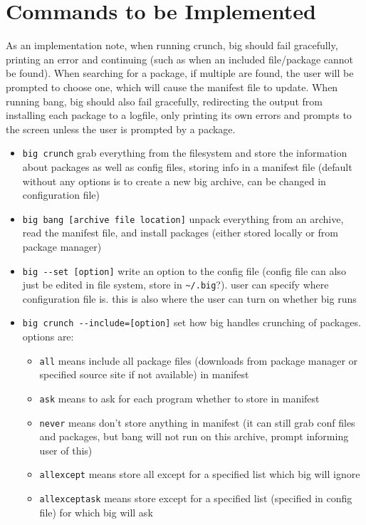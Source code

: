 \documentclass[12pt]{article}
\begin{document}
    \section{Commands to be Implemented}
        As an implementation note, when running crunch, big should fail gracefully, printing an error and continuing (such as when an included file/package cannot be found).  When searching for a package, if multiple are found, the user will be prompted to choose one, which will cause the manifest file to update.  When running bang, big should also fail gracefully, redirecting the output from installing each package to a logfile, only printing its own errors and prompts to the screen unless the user is prompted by a package.
        \begin{itemize}
            \item \verb+big crunch+ grab everything from the filesystem and store the information about packages as well as config files, storing info in a manifest file (default without any options is to create a new big archive, can be changed in configuration file)
            \item \verb+big bang [archive file location]+ unpack everything from an archive, read the manifest file, and install packages (either stored locally or from package manager)
            \item \verb+big --set [option]+ write an option to the config file (config file can also just be edited in file system, store in \verb+~/.big+?).  user can specify where configuration file is.  this is also where the user can turn on whether big runs 
            \item \verb+big crunch --include=[option]+ set how big handles crunching of packages.  options are: \begin{itemize}
                \item \verb+all+ means include all package files (downloads from package manager or specified source site if not available) in manifest
                \item \verb+ask+ means to ask for each program whether to store in manifest
                \item \verb+never+ means don't store anything in manifest (it can still grab conf files and packages, but bang will not run on this archive, prompt informing user of this)
                \item \verb+allexcept+ means store all except for a specified list which big will ignore
                \item \verb+allexceptask+ means store except for a specified list (specified in config file) for which big will ask

\end{itemize}
\end{itemize}
\end{document}
